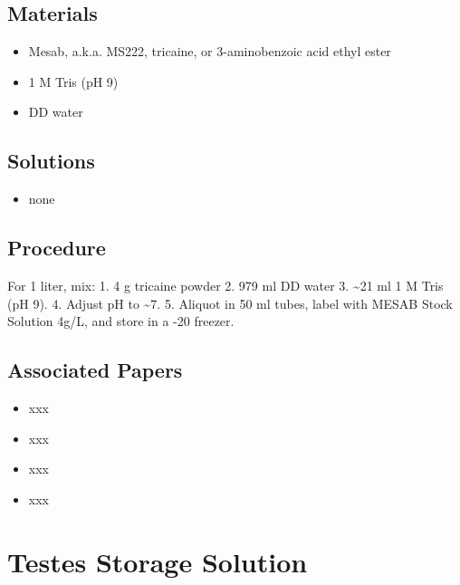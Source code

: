 \documentclass[
  letterpaper,
  DIV=11,
  numbers=noendperiod]{scrreprt}
\providecommand{\tightlist}{%
  \setlength{\itemsep}{0pt}\setlength{\parskip}{0pt}}\usepackage{longtable,booktabs,array}
\begin{document}
\hypertarget{materials-90}{%
\section{Materials}\label{materials-90}}

\begin{itemize}
\tightlist
\item
  Mesab, a.k.a. MS222, tricaine, or 3-aminobenzoic acid ethyl ester
\item
  1 M Tris (pH 9)
\item
  DD water
\end{itemize}

\hypertarget{solutions-81}{%
\section{Solutions}\label{solutions-81}}

\begin{itemize}
\tightlist
\item
  none
\end{itemize}

\hypertarget{procedure-89}{%
\section{Procedure}\label{procedure-89}}

For 1 liter, mix: 1. 4 g tricaine powder 2. 979 ml DD water 3.
\textasciitilde21 ml 1 M Tris (pH 9). 4. Adjust pH to \textasciitilde7.
5. Aliquot in 50 ml tubes, label with MESAB Stock Solution 4g/L, and
store in a -20 freezer.

\hypertarget{associated-papers-64}{%
\section{Associated Papers}\label{associated-papers-64}}

\begin{itemize}
\tightlist
\item
  xxx
\item
  xxx
\item
  xxx
\item
  xxx
\end{itemize}

\hypertarget{sec-recipe-testes_solution}{%
\chapter{Testes Storage Solution}\label{sec-recipe-testes_solution}}
\end{document}
